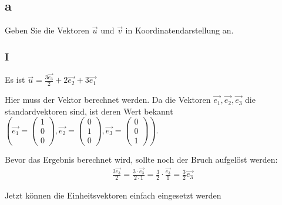 \subsection{a}
Geben Sie die Vektoren $\vec{u}$ und $\vec{v}$ in Koordinatendarstellung an.

\subsubsection{I}
Es ist $\vec{u} = \frac{3\vec{e_3}}{2} + 2\vec{e_2} + 3\vec{e_1}$

Hier muss der Vektor berechnet werden. Da die Vektoren $\vec{e_1}, \vec{e_2},
    \vec{e_3}$ die standardvektoren sind, ist deren Wert bekannt $\left(\vec{e_1} = \begin{pmatrix}
        1 \\ 0 \\ 0
    \end{pmatrix}, \vec{e_2} = \begin{pmatrix}
        0 \\ 1 \\ 0
    \end{pmatrix}, \vec{e_3} = \begin{pmatrix}
        0 \\ 0 \\ 1
    \end{pmatrix}\right)$.

Bevor das Ergebnis berechnet wird, sollte noch der Bruch aufgelöst werden:
\begin{align*}
    \frac{3\vec{e_3}}{2} = \frac{3 \cdot \vec{e_3}}{2 \cdot 1} = \frac{3}{2} \cdot \frac{\vec{e_3}}{1} = \frac{3}{2}\vec{e_3}
\end{align*}

Jetzt können die Einheitsvektoren einfach eingesetzt werden

